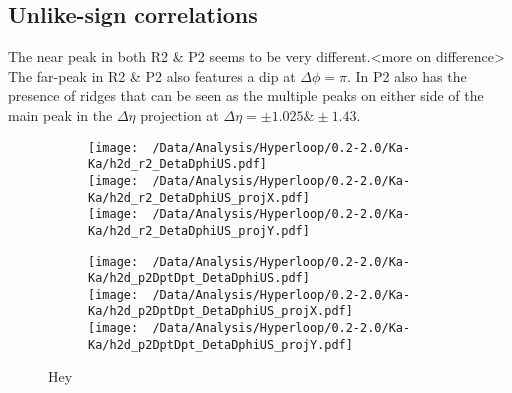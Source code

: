 \documentclass[12pt,a4paper,twoside]{report}
\begin{document}
\subsection{Unlike-sign correlations}
The near peak in both R2 \& P2 seems to be very different.<more on difference> The far-peak in R2 \& P2 also features a dip at $\Delta\phi=\pi$. In P2 also has the presence of ridges that can be seen as the multiple peaks on either side of the main peak in the $\Delta\eta$ projection at $\Delta\eta=\pm1.025\&\pm1.43$.
\begin{figure}[H]
	\begin{subfigure}{0.49\linewidth}
		\texttt{[image: ~/Data/Analysis/Hyperloop/0.2-2.0/Ka-Ka/h2d\_r2\_DetaDphiUS.pdf]}\\
		\texttt{[image: ~/Data/Analysis/Hyperloop/0.2-2.0/Ka-Ka/h2d\_r2\_DetaDphiUS\_projX.pdf]}\\
		\texttt{[image: ~/Data/Analysis/Hyperloop/0.2-2.0/Ka-Ka/h2d\_r2\_DetaDphiUS\_projY.pdf]}\\
	\end{subfigure}
	\begin{subfigure}{0.49\linewidth}
		\texttt{[image: ~/Data/Analysis/Hyperloop/0.2-2.0/Ka-Ka/h2d\_p2DptDpt\_DetaDphiUS.pdf]}\\
		\texttt{[image: ~/Data/Analysis/Hyperloop/0.2-2.0/Ka-Ka/h2d\_p2DptDpt\_DetaDphiUS\_projX.pdf]}\\
		\texttt{[image: ~/Data/Analysis/Hyperloop/0.2-2.0/Ka-Ka/h2d\_p2DptDpt\_DetaDphiUS\_projY.pdf]}\\
	\end{subfigure}
	\caption{Hey}
\end{figure}
\end{document}
